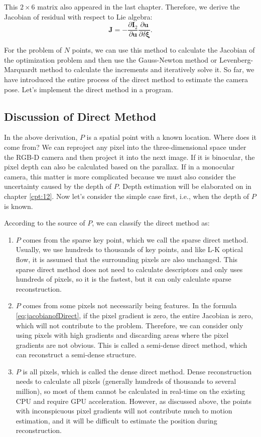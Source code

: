 This $2 \times 6$ matrix also appeared in the last chapter. Therefore, we derive the Jacobian of residual with respect to Lie algebra:
\begin{equation}
\label{eq:jacobianofDirect}
\mathbf{J} =  - \frac{{\partial { \mathbf{I}_2}}}{{\partial \mathbf{u}}}\frac{{\partial \mathbf{u}}}{{\partial \delta \boldsymbol{\xi} }}.
\end{equation}

For the problem of $N$ points, we can use this method to calculate the Jacobian of the optimization problem and then use the Gauss-Newton method or Levenberg-Marquardt method to calculate the increments and iteratively solve it. So far, we have introduced the entire process of the direct method to estimate the camera pose. Let's implement the direct method in a program.

\subsection{Discussion of Direct Method}
In the above derivation, $P$ is a spatial point with a known location. Where does it come from? We can reproject any pixel into the three-dimensional space under the RGB-D camera and then project it into the next image. If it is binocular, the pixel depth can also be calculated based on the parallax. If in a monocular camera, this matter is more complicated because we must also consider the uncertainty caused by the depth of $P$. Depth estimation will be elaborated on in chapter \ref{cpt:12}. Now let's consider the simple case first, i.e., when the depth of $P$ is known.

According to the source of $P$, we can classify the direct method as:
\begin{enumerate}
	\item $P$ comes from the sparse key point, which we call the sparse direct method. Usually, we use hundreds to thousands of key points, and like L-K optical flow, it is assumed that the surrounding pixels are also unchanged. This sparse direct method does not need to calculate descriptors and only uses hundreds of pixels, so it is the fastest, but it can only calculate sparse reconstruction.
	\item $P$ comes from some pixels not necessarily being features. In the formula \eqref{eq:jacobianofDirect}, if the pixel gradient is zero, the entire Jacobian is ​​zero, which will not contribute to the problem. Therefore, we can consider only using pixels with high gradients and discarding areas where the pixel gradients are not obvious. This is called a semi-dense direct method, which can reconstruct a semi-dense structure.
	\item $P$ is all pixels, which is called the dense direct method. Dense reconstruction needs to calculate all pixels (generally hundreds of thousands to several million), so most of them cannot be calculated in real-time on the existing CPU and require GPU acceleration. However, as discussed above, the points with inconspicuous pixel gradients will not contribute much to motion estimation, and it will be difficult to estimate the position during reconstruction.
\end{enumerate}

